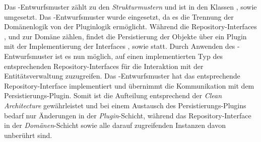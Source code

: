 Das -Entwurfsmuster zählt zu den \textit{Strukturmustern} und ist in den Klassen ,  sowie  umgesetzt.
Das -Entwurfsmuster wurde eingesetzt, da es die Trennung der Domänenlogik von der Pluginlogik ermöglicht.
Während die Repository-Interfaces ,  und  zur Domäne zählen, findet die Persistierung der Objekte über ein Plugin mit der Implementierung der Interfaces ,  sowie  statt.
Durch Anwenden des -Entwurfsmuster ist es nun möglich, auf einen implementierten Typ des entsprechenden Repository-Interfaces für die Interaktion mit der Entitätsverwaltung zuzugreifen.
Das -Entwurfsmuster hat das entsprechende Repository-Interface implementiert und übernimmt die Kommunikation mit dem Persistierungs-Plugin.
Somit ist die Aufteilung entsprechend der \textit{Clean Architecture} gewährleistet und bei einem Austausch des Persistierungs-Plugins bedarf nur Änderungen in der \textit{Plugin}-Schicht, während das Repository-Interface in der \textit{Domänen}-Schicht sowie alle darauf zugreifenden Instanzen davon unberührt sind.
